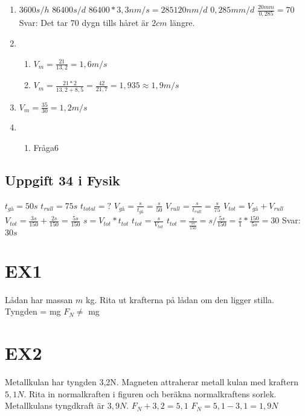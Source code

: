 \documentclass[a4paper,11pt]{article}
\begin{document}
\begin{flushleft}
\begin{enumerate}
  \item $ 3600s/h $\newline
  $ 86400s/d $\newline
  $ 86400*3,3nm/s=285120nm/d $\newline
  $ 0,285mm/d $\newline
  $ \frac{20mm}{0,285}=70 $\newline
  Svar: Det tar 70 dygn tills håret är $2cm$ längre.
  \item \begin{enumerate}
    \item $ V_m=\frac{21}{13,2}=1,6m/s $\newline
    \item $ V_m=\frac{21*2}{13,2+8,5}=\frac{42}{21,7}=1,935\approx1,9m/s $\newline
  \end{enumerate}
  \item $ V_m=\frac{35}{30}=1,2m/s $
  \item \begin{enumerate}
    \item Fråga6
  \end{enumerate}
\end{enumerate}
\newpage
\subsection{Uppgift 34 i Fysik}
$ t_{gå}=50s $\newline
$ t_{rull}=75s $\newline
$ t_{total}=?$\newline
$ V_{gå}=\frac{s}{t_{gå}}=\frac{s}{50} $\newline
$ V_{rull}=\frac{s}{t_{rull}}=\frac{s}{75} $\newline
$ V_{tot}=V_{gå}+V_{rull} $\newline
$ V_{tot}=\frac{3s}{150}+\frac{2s}{150}=\frac{5s}{150} $\newline
$ s=V_{tot}*t_{tot} $\newline
$ t_{tot}=\frac{s}{V_{tot}} $\newline
$ t_{tot}=\frac{s}{\frac{5s}{150}}=s/\frac{5s}{150}=\frac{s}{1}*\frac{150}{5s}=30 $\newline
Svar: $30s$
\section{EX1}
Lådan har massan $m$ kg.
Rita ut krafterna på lådan om den ligger stilla.\newline
Tyngden = mg\newline
$ F_N  \neq $ mg
\section{EX2}
Metallkulan har tyngden 3,2N. Magneten attraherar metall kulan med kraftern $ 5,1N $. Rita in normalkraften i figuren och beräkna normalkraftens sorlek. Metallkulans tyngdkraft är $ 3,9N $.\newline
$ F_N+3,2=5,1 $\newline
$ F_N=5,1-3,1=1,9N $
\end{flushleft}
\end{document}
